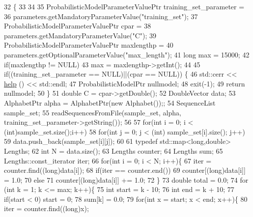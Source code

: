 \begin{DoxyCode}
32   \{
33 
34 
35     ProbabilisticModelParameterValuePtr training\_set\_parameter =
36       parameters.getMandatoryParameterValue(\textcolor{stringliteral}{"training\_set"});
37     ProbabilisticModelParameterValuePtr cpar =
38       parameters.getMandatoryParameterValue(\textcolor{stringliteral}{"C"});
39     ProbabilisticModelParameterValuePtr maxlengthp =
40       parameters.getOptionalParameterValue(\textcolor{stringliteral}{"max\_length"});
41     \textcolor{keywordtype}{long} max = 15000;
42     \textcolor{keywordflow}{if}(maxlengthp != NULL)
43         max = maxlengthp->getInt();
44 
45     \textcolor{keywordflow}{if}((training\_set\_parameter == NULL)||(cpar == NULL)) \{
46       std::cerr << \hyperlink{classtops_1_1SmoothedHistogramBurge_a3135346db37989216ee0b5769b670218}{help} () << std::endl;
47       ProbabilisticModelPtr nullmodel;
48       exit(-1);
49       \textcolor{keywordflow}{return} nullmodel;
50     \}
51     \textcolor{keywordtype}{double} C = cpar->getDouble();
52     DoubleVector data;
53     AlphabetPtr alpha = AlphabetPtr(\textcolor{keyword}{new} Alphabet());;
54     SequenceList sample\_set;
55     readSequencesFromFile(sample\_set, alpha, training\_set\_parameter->getString());
56 
57     \textcolor{keywordflow}{for}(\textcolor{keywordtype}{int} i = 0; i < (int)sample\_set.size();i++)
58       \textcolor{keywordflow}{for}(\textcolor{keywordtype}{int} j = 0; j < (int) sample\_set[i].size(); j++)
59         data.push\_back(sample\_set[i][j]);
60 
61     \textcolor{keyword}{typedef} std::map<long,double> Lengths;
62     \textcolor{keywordtype}{int} N = data.size();
63     Lengths counter;
64     Lengths sum;
65     Lengths::const\_iterator iter;
66     \textcolor{keywordflow}{for}(\textcolor{keywordtype}{int} i = 0; i < N; i++)\{
67       iter = counter.find((\textcolor{keywordtype}{long})data[i]);
68       \textcolor{keywordflow}{if}(iter == counter.end())
69         counter[(\textcolor{keywordtype}{long})data[i]] = 1.0;
70       \textcolor{keywordflow}{else}
71         counter[(long)data[i]] += 1.0;
72     \}
73     \textcolor{keywordtype}{double} total = 0.0;
74     \textcolor{keywordflow}{for} (\textcolor{keywordtype}{int} k = 1; k <= max; k++)\{
75       \textcolor{keywordtype}{int} start = k - 10;
76       \textcolor{keywordtype}{int} end = k + 10;
77       \textcolor{keywordflow}{if}(start < 0)  start = 0;
78       sum[k] = 0.0;
79       \textcolor{keywordflow}{for}(\textcolor{keywordtype}{int} x = start; x < end; x++)\{
80         iter = counter.find((\textcolor{keywordtype}{long})x);

\end{DoxyCode}

